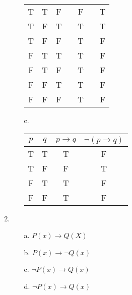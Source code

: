 \begin{enumerate}
\begin{itemize}
\begin{tabular}{ c c c | p{2cm} c | p{2cm} c | }
                    \\
                    T & T & F &
                    &  F  &
                    &  T 

                    \\
                    T & F & T & 
                    &  T  &
                    &  T 

                    \\
                    T & F & F &
                    &  T  &
                    &  F 

                    \\
                    F & T & T &
                    &  T  &
                    &  F 

                    \\
                    F & T & F &
                    &  T  &
                    &  F 

                    \\
                    F & F & T &
                    &  T  &
                    &  F 

                    \\
                    F & F & F &
                    &  T  &
                    &  F 
                \end{tabular}
                        
            \item[c.]  
                \begin{tabular}{c c | c | c}
                    $p$ & $q$ & $p \to q$ & $\neg(p \to q)$
                    \\ \hline
                    T & T
                    &  T 
                    &  F 
                    \\
                    T & F
                    &  F 
                    &  T 
                    \\
                    F & T
                    &  T 
                    &  F 
                    \\
                    F & F
                    &  T 
                    &  F 
                \end{tabular}
        \end{itemize}

    \item
        \begin{itemize}
            \item[a.]  $P(x) \to Q(X)$
            \item[b.]  $P(x) \to \neg Q(x)$
            \item[c.]  $\neg P(x) \to Q(x)$
            \item[d.]  $\neg P(x) \to Q(x)$
        \end{itemize}


\end{enumerate}
